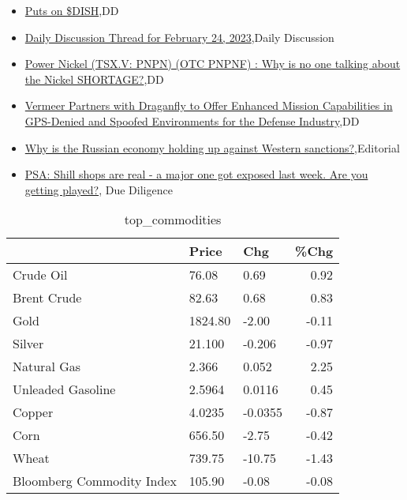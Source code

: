\documentclass{article}%
\begin{document}
%
\begin{itemize}%
\item%
\href{https://reddit.com/r/wallstreetbets/comments/11aqese/puts\_on\_dish/}{Puts on \$DISH},DD%
\item%
\href{https://reddit.com/r/wallstreetbets/comments/11aorm2/daily\_discussion\_thread\_for\_february\_24\_2023/}{Daily Discussion Thread for February 24, 2023},Daily Discussion%
\item%
\href{https://reddit.com/r/Baystreetbets/comments/11aje5o/power\_nickel\_tsxv\_pnpn\_otc\_pnpnf\_why\_is\_no\_one/}{Power Nickel (TSX.V: PNPN) (OTC PNPNF) : Why is no one talking about the Nickel SHORTAGE?},DD%
\item%
\href{https://reddit.com/r/Baystreetbets/comments/11a33l1/vermeer\_partners\_with\_draganfly\_to\_offer\_enhanced/}{Vermeer Partners with Draganfly to Offer Enhanced Mission Capabilities in GPS-Denied and Spoofed Environments for the Defense Industry},DD%
\item%
\href{https://reddit.com/r/Economics/comments/11aldpi/why\_is\_the\_russian\_economy\_holding\_up\_against/}{Why is the Russian economy holding up against Western sanctions?},Editorial%
\item%
\href{https://reddit.com/r/Superstonk/comments/11aqay4/psa\_shill\_shops\_are\_real\_a\_major\_one\_got\_exposed/}{PSA: Shill shops are real - a major one got exposed last week. Are you getting played?}, Due Diligence%
\end{itemize}%


\begin{table}[htbp]%
\caption{top\_commodities}%
\centering%
\begin{adjustbox}{width=1\textwidth}%
\begin{tabular}{lllr}
\toprule
                          &   Price &     Chg &  \%Chg \\
\midrule
               Crude Oil  &   76.08 &    0.69 &  0.92 \\
             Brent Crude  &   82.63 &    0.68 &  0.83 \\
                    Gold  & 1824.80 &   -2.00 & -0.11 \\
                  Silver  &  21.100 &  -0.206 & -0.97 \\
             Natural Gas  &   2.366 &   0.052 &  2.25 \\
       Unleaded Gasoline  &  2.5964 &  0.0116 &  0.45 \\
                  Copper  &  4.0235 & -0.0355 & -0.87 \\
                    Corn  &  656.50 &   -2.75 & -0.42 \\
                   Wheat  &  739.75 &  -10.75 & -1.43 \\
Bloomberg Commodity Index &  105.90 &   -0.08 & -0.08 \\
\bottomrule
\end{tabular}
%
\end{adjustbox}%
\end{table}
\end{document}
